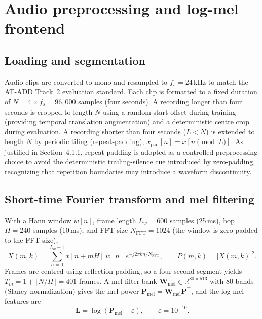 \documentclass[12pt,a4paper]{report}
\begin{document}
\section{Audio preprocessing and log-mel frontend}
\label{sec:frontend}

\subsection{Loading and segmentation}

Audio clips are converted to mono and resampled to $f_s = 24\,\text{kHz}$ to match the AT-ADD Track~2 evaluation standard. Each clip is formatted to a fixed duration of $N = 4 \times f_s = 96{,}000$ samples (four seconds). A recording longer than four seconds is cropped to length $N$ using a random start offset during training (providing temporal translation augmentation) and a deterministic centre crop during evaluation. A recording shorter than four seconds ($L < N$) is extended to length $N$ by periodic tiling (repeat-padding), $x_{\mathrm{pad}}[n] = x[n \pmod L]$. As justified in Section~4.1.1, repeat-padding is adopted as a controlled preprocessing choice to avoid the deterministic trailing-silence cue introduced by zero-padding, recognizing that repetition boundaries may introduce a waveform discontinuity.

\subsection{Short-time Fourier transform and mel filtering}

With a Hann window $w[n]$, frame length $L_w = 600$ samples (25\,ms), hop $H = 240$ samples (10\,ms), and FFT size $N_{\mathrm{FFT}} = 1024$ (the window is zero-padded to the FFT size),
\begin{equation}
X(m,k) = \sum_{n=0}^{L_w-1} x[n + mH]\, w[n]\, e^{-j2\pi kn / N_{\mathrm{FFT}}}, \qquad P(m,k) = |X(m,k)|^2 .
\label{eq:stft}
\end{equation}
Frames are centred using reflection padding, so a four-second segment yields $T_m = 1 + \lfloor N/H \rfloor = 401$ frames. A mel filter bank $\mathbf{W}_{\mathrm{mel}} \in \mathbb{R}^{80 \times 513}$ with 80 bands (Slaney normalization) gives the mel power $\mathbf{P}_{\mathrm{mel}} = \mathbf{W}_{\mathrm{mel}} \mathbf{P}^{\top}$, and the log-mel features are
\begin{equation}
\mathbf{L} = \log(\mathbf{P}_{\mathrm{mel}} + \varepsilon), \qquad \varepsilon = 10^{-10}.
\label{eq:logmel}
\end{equation}
\end{document}
